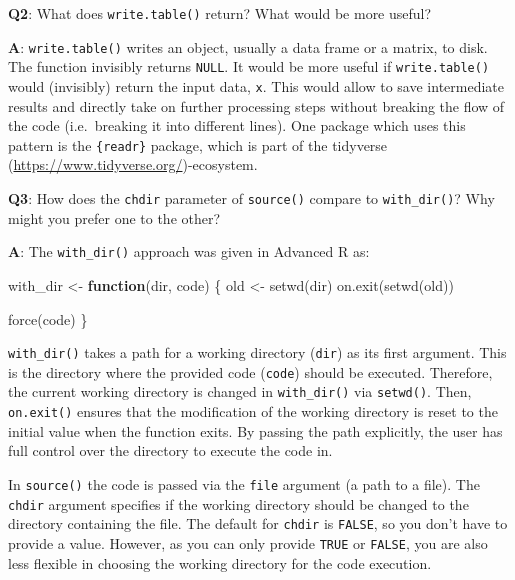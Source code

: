 \documentclass[
]{krantz}
\makeatletter
\newenvironment{Shaded}{\begin{snugshade}}{\end{snugshade}}
\newcommand{\ControlFlowTok}[1]{\textcolor[rgb]{0.13,0.29,0.53}{\textbf{#1}}}
\newcommand{\KeywordTok}[1]{\textcolor[rgb]{0.13,0.29,0.53}{\textbf{#1}}}
\newcommand{\NormalTok}[1]{#1}
\newcommand{\StringTok}[1]{\textcolor[rgb]{0.31,0.60,0.02}{#1}}
\renewcommand{\href}[2]{#2 (\url{#1})}
\newenvironment{kframe}{%
\medskip{}
\setlength{\fboxsep}{.8em}
 \def\at@end@of@kframe{}%
 \ifinner\ifhmode%
  \def\at@end@of@kframe{\end{minipage}}%
  \begin{minipage}{\columnwidth}%
 \fi\fi%
 \def\FrameCommand##1{\hskip\@totalleftmargin \hskip-\fboxsep
 \colorbox{shadecolor}{##1}\hskip-\fboxsep
     \hskip-\linewidth \hskip-\@totalleftmargin \hskip\columnwidth}%
 \MakeFramed {\advance\hsize-\width
   \@totalleftmargin\z@ \linewidth\hsize
   \@setminipage}}%
 {\par\unskip\endMakeFramed%
 \at@end@of@kframe}
\renewenvironment{Shaded}{\begin{kframe}}{\end{kframe}}
\renewcommand{\KeywordTok} [1]{\textcolor[rgb]{0.00,0.44,0.13}{{#1}}}
\renewcommand{\StringTok}  [1]{\textcolor[rgb]{0.25,0.44,0.63}{{#1}}}
\renewcommand{\NormalTok}  [1]{{#1}}
\makeatother
\begin{document}
\textbf{{Q2}}: What does \texttt{write.table()} return? What would be more useful?

\textbf{{A}}: \texttt{write.table()} writes an object, usually a data frame or a matrix, to disk. The function invisibly returns \texttt{NULL}. It would be more useful if \texttt{write.table()} would (invisibly) return the input data, \texttt{x}. This would allow to save intermediate results and directly take on further processing steps without breaking the flow of the code (i.e.~breaking it into different lines). One package which uses this pattern is the \texttt{\{readr\}} package, which is part of the \href{https://www.tidyverse.org/}{tidyverse}-ecosystem.

\textbf{{Q3}}: How does the \texttt{chdir} parameter of \texttt{source()} compare to \texttt{with\_dir()}? Why might you prefer one to the other?

\textbf{{A}}: The \texttt{with\_dir()} approach was given in Advanced R as:

\begin{Shaded}
\begin{Highlighting}[]
\NormalTok{with_dir <-}\StringTok{ }\ControlFlowTok{function}\NormalTok{(dir, code) \{}
\NormalTok{  old <-}\StringTok{ }\KeywordTok{setwd}\NormalTok{(dir)}
  \KeywordTok{on.exit}\NormalTok{(}\KeywordTok{setwd}\NormalTok{(old))}
  
  \KeywordTok{force}\NormalTok{(code)}
\NormalTok{\}}
\end{Highlighting}
\end{Shaded}

\texttt{with\_dir()} takes a path for a working directory (\texttt{dir}) as its first argument. This is the directory where the provided code (\texttt{code}) should be executed. Therefore, the current working directory is changed in \texttt{with\_dir()} via \texttt{setwd()}. Then, \texttt{on.exit()} ensures that the modification of the working directory is reset to the initial value when the function exits. By passing the path explicitly, the user has full control over the directory to execute the code in.

In \texttt{source()} the code is passed via the \texttt{file} argument (a path to a file). The \texttt{chdir} argument specifies if the working directory should be changed to the directory containing the file. The default for \texttt{chdir} is \texttt{FALSE}, so you don't have to provide a value. However, as you can only provide \texttt{TRUE} or \texttt{FALSE}, you are also less flexible in choosing the working directory for the code execution.
\end{document}
